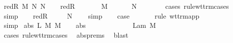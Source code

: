 \begin{isabellebody}
\isamarkupfalse%
\isanewline
{}\isamarkupfalse%
\ {\isacharparenleft}red{\isacharunderscore}R\ M\ N\ N{\isacharprime}{\isacharparenright}\isanewline
\ \ \isamarkupfalse%
\ red{\isacharunderscore}R{\isacharparenleft}{}{\isacharparenright}\ \isamarkupfalse%
\ {\isasymtau}\ \ {}{\isacharcolon}\ {\isachardoublequoteopen}{\isasymGamma}\ {\isasymturnstile}\ M\ {\isacharcolon}\ {\isasymtau}\ {\isasymrightarrow}\ {\isasymsigma}{\isachardoublequoteclose}\ {\isachardoublequoteopen}{\isasymGamma}\ {\isasymturnstile}\ N\ {\isacharcolon}\ {\isasymtau}{\isachardoublequoteclose}\isanewline
\ \ \ \ \isamarkupfalse%
\ {\isacharparenleft}cases\ rule{\isacharcolon}wt{\isacharunderscore}trm{\isachardot}cases{\isacharparenright}\ \isamarkupfalse%
\ simp\isanewline
\ \ \isamarkupfalse%
\ red{\isacharunderscore}R{\isacharparenleft}{}{\isacharparenright}\ \isamarkupfalse%
\ {}{\isacharcolon}\ {\isachardoublequoteopen}{\isasymGamma}\ {\isasymturnstile}\ N{\isacharprime}\ {\isacharcolon}\ {\isasymtau}{\isachardoublequoteclose}\ \isamarkupfalse%
\ simp\isanewline
\ \ \isamarkupfalse%
\ {\isacharquery}case\ \isanewline
\ \ \ \ \isamarkupfalse%
\ {\isacharparenleft}rule\ wt{\isacharunderscore}trm{\isachardot}app{\isacharparenright}\isanewline
\ \ \ \ \isamarkupfalse%
\ {}\ {}\ \isamarkupfalse%
\ simp{\isacharplus}\isanewline
{}\isamarkupfalse%
\isanewline
{}\isamarkupfalse%
\ {\isacharparenleft}abs\ L\ M\ M{\isacharprime}{\isacharparenright}\isanewline
\ \ \isamarkupfalse%
\ abs{\isacharparenleft}{}{\isacharparenright}\ \isamarkupfalse%
\ {\isasympi}\ {\isasymtau}\ \ {}{\isacharcolon}\ {\isachardoublequoteopen}{\isasymsigma}\ {\isacharequal}\ {\isasympi}\ {\isasymrightarrow}\ {\isasymtau}{\isachardoublequoteclose}\ {\isachardoublequoteopen}{\isasymGamma}\ {\isasymturnstile}\ Lam\ M\ {\isacharcolon}\ {\isasympi}\ {\isasymrightarrow}\ {\isasymtau}{\isachardoublequoteclose}\isanewline
\ \ \ \ \isamarkupfalse%
\ {\isacharparenleft}cases\ rule{\isacharcolon}wt{\isacharunderscore}trm{\isachardot}cases{\isacharparenright}\ \isamarkupfalse%
\ abs{\isachardot}prems\ \isamarkupfalse%
\ blast\isanewline
\ \ \isamarkupfalse%

\end{isabellebody}
